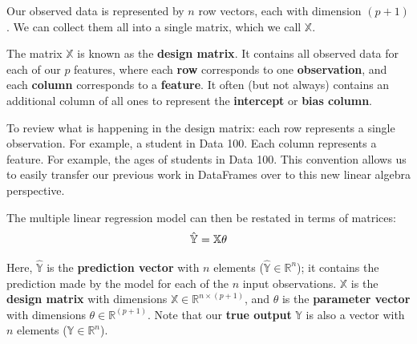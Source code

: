 \documentclass[
  letterpaper,
  DIV=11,
  numbers=noendperiod]{scrreprt}
\begin{document}
Our observed data is represented by \(n\) row vectors, each with
dimension \((p+1)\). We can collect them all into a single matrix, which
we call \(\mathbb{X}\).

The matrix \(\mathbb{X}\) is known as the \textbf{design matrix}. It
contains all observed data for each of our \(p\) features, where each
\textbf{row} corresponds to one \textbf{observation}, and each
\textbf{column} corresponds to a \textbf{feature}. It often (but not
always) contains an additional column of all ones to represent the
\textbf{intercept} or \textbf{bias column}.

To review what is happening in the design matrix: each row represents a
single observation. For example, a student in Data 100. Each column
represents a feature. For example, the ages of students in Data 100.
This convention allows us to easily transfer our previous work in
DataFrames over to this new linear algebra perspective.

The multiple linear regression model can then be restated in terms of
matrices: \[
\Large
\mathbb{\hat{Y}} = \mathbb{X} \theta
\]

Here, \(\mathbb{\hat{Y}}\) is the \textbf{prediction vector} with \(n\)
elements (\(\mathbb{\hat{Y}} \in \mathbb{R}^{n}\)); it contains the
prediction made by the model for each of the \(n\) input observations.
\(\mathbb{X}\) is the \textbf{design matrix} with dimensions
\(\mathbb{X} \in \mathbb{R}^{n \times (p + 1)}\), and \(\theta\) is the
\textbf{parameter vector} with dimensions
\(\theta \in \mathbb{R}^{(p + 1)}\). Note that our \textbf{true output}
\(\mathbb{Y}\) is also a vector with \(n\) elements
(\(\mathbb{Y} \in \mathbb{R}^{n}\)).
\end{document}
